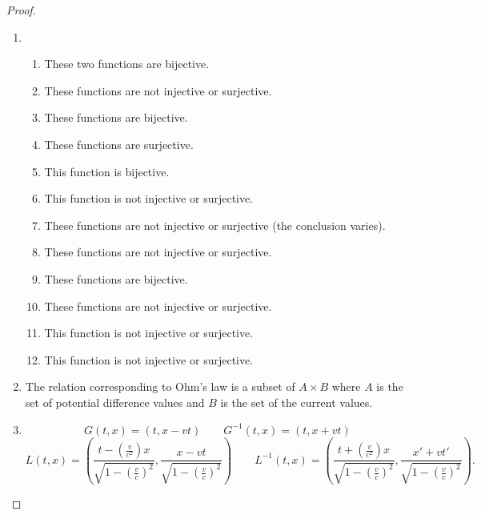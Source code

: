 \begin{proof}
    \begin{enumerate}[label={(\alph*)}]
        \item \begin{enumerate}[label={\arabic*.}]
                  \item These two functions are bijective.
                  \item These functions are not injective or surjective.
                  \item These functions are bijective.
                  \item These functions are surjective.
                  \item This function is bijective.
                  \item This function is not injective or surjective.
                  \item These functions are not injective or surjective (the conclusion varies).
                  \item These functions are not injective or surjective.
                  \item These functions are bijective.
                  \item These functions are not injective or surjective.
                  \item This function is not injective or surjective.
                  \item This function is not injective or surjective.
              \end{enumerate}
        \item The relation corresponding to Ohm's law is a subset of $A\times B$ where $A$ is the set of potential difference values and $B$ is the set of the current values.
        \item \[
                  G(t, x) = \left(t, x - vt\right)\qquad G^{-1}(t, x) = (t, x + vt)
              \]
              \[
                  L(t, x) = \left(\frac{t - \left(\frac{v}{c^{2}}\right)x}{\sqrt{1 - {\left(\frac{v}{c}\right)}^{2}}}, \frac{x - vt}{\sqrt{1 - {\left(\frac{v}{c}\right)}^{2}}}\right)\qquad L^{-1}(t, x) = \left(\frac{t + \left(\frac{v}{c^{2}}\right)x}{\sqrt{1 - {\left(\frac{v}{c}\right)}^{2}}}, \frac{x' + vt'}{\sqrt{1 - {\left(\frac{v}{c}\right)}^{2}}} \right).
              \]
    \end{enumerate}
\end{proof}
\newpage

